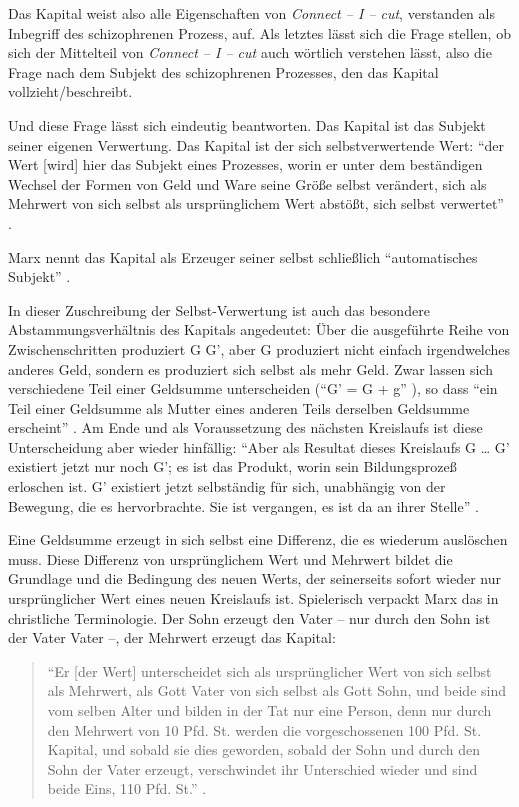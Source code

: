 \documentclass[12pt,
               DIV13,
               paper=a4,
               twoside=false,
               onehalfspacing,
               bibliography=totoc,
               toc=graduated,
               draft,
               ]{scrartcl}
\newcommand{\pc}[2]{\parencite[#1]{#2}}
\newcommand{\cic}{Connect -- I -- cut\xspace}
\begin{document}
Das Kapital weist also alle Eigenschaften von \emph{\cic}, verstanden
als Inbegriff des schizophrenen Prozess, auf. Als letztes lässt sich
die Frage stellen, ob sich der Mittelteil von \emph{\cic} auch
wörtlich verstehen lässt, also die Frage nach dem Subjekt des
schizophrenen Prozesses, den das Kapital vollzieht/beschreibt.

Und diese Frage lässt sich eindeutig beantworten. Das Kapital ist das
Subjekt seiner eigenen Verwertung. Das Kapital ist der sich
selbstverwertende Wert: "`der Wert [wird]
hier das Subjekt eines Prozesses, worin er unter dem beständigen
Wechsel der Formen von Geld und Ware seine Größe selbst verändert,
sich als Mehrwert von sich selbst als ursprünglichem Wert abstößt,
sich selbst verwertet"' \pc{169}{kap}.

Marx nennt das Kapital als Erzeuger seiner selbst schließlich
"`automatisches Subjekt"' \pc{169}{kap}.

In dieser Zuschreibung der Selbst-Verwertung ist auch das besondere
\glq Abstammungsverhältnis\grq{} des Kapitals angedeutet: Über die
ausgeführte Reihe von Zwischenschritten \glq produziert\grq{} G G',
aber G \grq produziert\grq{} nicht einfach irgendwelches anderes Geld,
sondern es produziert sich selbst als mehr Geld. Zwar lassen sich
verschiedene Teil einer Geldsumme unterscheiden ("`G' = G + g"'
\pc{51}{kap2}), so dass "`ein Teil einer Geldsumme als Mutter eines
anderen Teils derselben Geldsumme erscheint"' \pc{55}{kap2}. Am Ende
und als Voraussetzung des nächsten Kreislaufs ist diese Unterscheidung
aber wieder hinfällig: "`Aber als Resultat dieses Kreislaufs G \dots
G' existiert jetzt nur noch G'; es ist das Produkt, worin sein
Bildungsprozeß erloschen ist. G' existiert jetzt selbständig für sich,
unabhängig von der Bewegung, die es hervorbrachte. Sie ist vergangen,
es ist da an ihrer Stelle"' \pc{49}{kap2}.

Eine Geldsumme erzeugt in sich selbst eine Differenz, die es wiederum
auslöschen muss. Diese Differenz von ursprünglichem Wert und Mehrwert
bildet die Grundlage und die Bedingung des neuen Werts, der
seinerseits sofort wieder nur \glq ursprünglicher\grq{} Wert eines
neuen Kreislaufs ist. Spielerisch verpackt Marx das in christliche
Terminologie. Der Sohn erzeugt den Vater -- nur durch den Sohn ist der
Vater Vater --, der Mehrwert erzeugt das Kapital:
%
\begin{spacing}{1}
\begin{quote}
"`Er [der Wert] unterscheidet sich als ursprünglicher
Wert von sich selbst als Mehrwert, als Gott Vater von sich selbst als
Gott Sohn, und beide sind vom selben Alter und bilden in der Tat nur
eine Person, denn nur durch den Mehrwert von 10 Pfd. St. werden die
vorgeschossenen 100 Pfd. St. Kapital, und sobald sie dies geworden,
sobald der Sohn und durch den Sohn der Vater erzeugt, verschwindet ihr
Unterschied wieder und sind beide Eins, 110 Pfd. St."' \pc{S. 169
f.}{kap}.
\end{quote}
\end{spacing}
\end{document}

